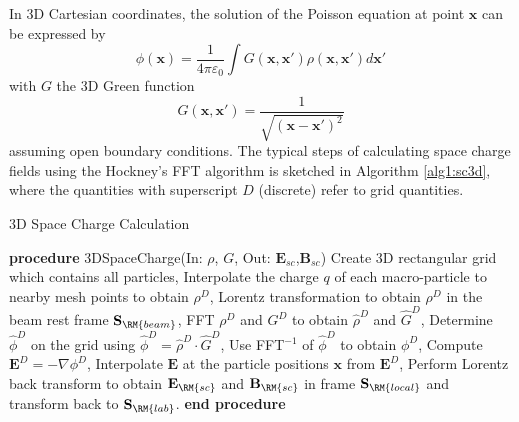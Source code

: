 \documentclass[acus]{JAC2003}
\newcommand{\bs}[1]{\mathbf #1}
\begin{document}
In 3D Cartesian coordinates, the solution of the Poisson equation at point $\bs{x}$ can be expressed by 
\begin{equation}\label{eq:Poten}
  \phi(\bs{x})= \frac{1}{4\pi\varepsilon_0}\int{G(\bs{x},\bs{x}')\rho(\bs{x},\bs{x}')d\bs{x}'}
\end{equation}
with $G$ the 3D Green function 
\begin{equation}\label{eq:Green}
  G(\bs{x},\bs{x}')= \frac{1}{\sqrt{(\bs{x}-\bs{x}')^2}}
\end{equation}
assuming open boundary conditions.
The typical steps of calculating space charge fields using the Hockney's FFT algorithm is sketched in Algorithm \ref{alg1:sc3d},
where the quantities with superscript $D$ (discrete) refer to grid quantities.

\begin{algorithm}
  \caption{3D Space Charge Calculation} 
  \label{alg1:sc3d}
  \begin{algorithmic}[1]
    \STATE \textbf{procedure} 3DSpaceCharge(In: $\rho$, $G$, Out: $\bs{E_{sc}}$,$\bs{B_{sc}}$)
       \STATE Create 3D rectangular grid which contains all particles, %
       \STATE Interpolate the charge $q$ of each macro-particle to nearby mesh points to obtain $\rho^D$, 
       \STATE Lorentz transformation to obtain $\rho^D$ in the beam rest frame $\bs{S}_{\RM{beam}}$,
       \STATE FFT $\rho^D$ and $G^D$ to obtain $\widehat{\rho}^D$ and $\widehat{G}^D$,
       \STATE Determine $\widehat{\phi}^D$ on the grid using $\widehat{\phi}^D = \widehat{\rho}^D \cdot \widehat{G}^D$,
       \STATE Use FFT$^{-1}$ of $\widehat{\phi }^D$ to obtain $\phi^D$,
       \STATE Compute $\bs{E}^D= -\nabla \phi^D$,
       \STATE Interpolate $\bs{E}$ at the particle positions $\bs{x}$ from $\bs{E}^D$,
       \STATE Perform Lorentz back transform to obtain $\bs{E_{\RM{sc}}}$ and $\bs{B_{\RM{sc}}}$ in  frame $\bs{S}_{\RM{local}}$ and transform back  to $\bs{S}_{\RM{lab}}$.
       \STATE \textbf{end procedure}
  \end{algorithmic}
\end{algorithm}
\end{document}

